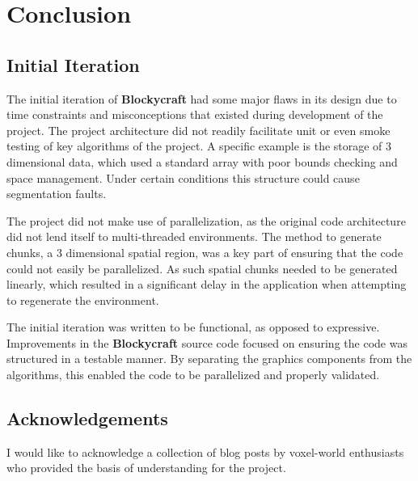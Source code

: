 \documentclass{book}
\newcommand{\Blockycraft}{\textbf{Blockycraft}}
\begin{document}

\chapter{Conclusion}
\section{Initial Iteration}
The initial iteration of \Blockycraft{} had some major flaws in its design due to time constraints and misconceptions that existed during development of the project.  The project architecture did not readily facilitate unit or even smoke testing of key algorithms of the project.  A specific example is the storage of 3 dimensional data, which used a standard array with poor bounds checking and space management.  Under certain conditions this structure could cause segmentation faults.   

The project did not make use of parallelization, as the original code architecture did not lend itself to multi-threaded environments.  The method to generate chunks, a 3 dimensional spatial region, was a key part of ensuring that the code could not easily be parallelized.  As such spatial chunks needed to be generated linearly, which resulted in a significant delay in the application when attempting to regenerate the environment.

The initial iteration was written to be functional, as opposed to expressive.  Improvements in the \Blockycraft{} source code focused on ensuring the code was structured in a testable manner.  By separating the graphics components from the algorithms, this enabled the code to be parallelized and properly validated.

\section{Acknowledgements}
I would like to acknowledge a collection of blog posts by voxel-world enthusiasts who provided the basis of understanding for the project.
\end{document}
